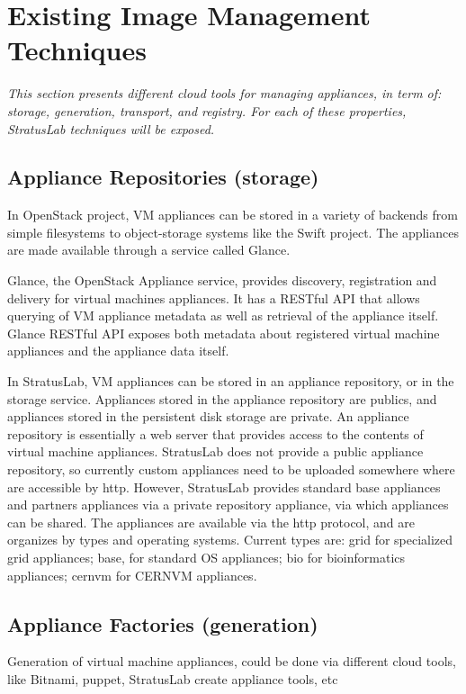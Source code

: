 \section{Existing Image Management Techniques}
\label{sec:other-approaches}

{\em This section presents different cloud tools for managing  appliances, in term of:  storage, generation, transport, and registry.
For each of these properties, StratusLab techniques will be exposed.}

\subsection{Appliance Repositories (storage)}
In OpenStack project, VM appliances can be stored in a variety of backends from simple filesystems to object-storage systems like the Swift project. The appliances are made available through a service called Glance. 

Glance, the OpenStack Appliance service, provides discovery, registration and delivery for virtual machines appliances. It has a RESTful API that allows querying of VM appliance metadata as well as retrieval of the appliance itself.
Glance RESTful API exposes both metadata about registered virtual machine appliances and the appliance data itself. 

In StratusLab, VM appliances can be stored in an appliance repository, or in the storage service. Appliances stored in the appliance repository are publics, and appliances stored in the persistent disk storage are private.
An appliance repository is essentially a web server that provides access to the contents of virtual machine appliances. StratusLab does not provide a public appliance repository, so currently custom appliances need to be uploaded somewhere where are accessible by http. However, StratusLab provides standard base appliances and partners appliances via a private repository appliance, via which appliances can be shared. The appliances are available via the http protocol, and  are organizes by types and operating systems.  Current types are: grid for specialized grid appliances; base, for standard OS appliances; bio for bioinformatics appliances; cernvm for CERNVM appliances. 

\subsection{Appliance Factories (generation)}
Generation of virtual machine appliances, could be done via different  cloud tools, like Bitnami, puppet, StratusLab create appliance tools, etc

